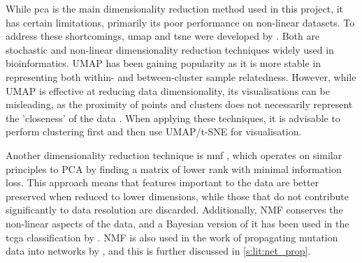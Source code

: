 While \acrshort{pca} is the main dimensionality reduction method used in this project, it has certain limitations, primarily its poor performance on non-linear datasets. To address these shortcomings, \acrfull{umap} and \acrfull{tsne} were developed by \citet{McInnes2018-dz,Hinton2002-pz} . Both are stochastic and non-linear dimensionality reduction techniques widely used in bioinformatics. UMAP has been gaining popularity as it is more stable in representing both within- and between-cluster sample relatedness. However, while UMAP is effective at reducing data dimensionality, its visualisations can be misleading, as the proximity of points and clusters does not necessarily represent the 'closeness' of the data \citep{Chari2023-et}. When applying these techniques, it is advisable to perform clustering first and then use UMAP/t-SNE for visualisation.

Another dimensionality reduction technique is \acrfull{nmf} \citep{Lee1999-fj}, which operates on similar principles to PCA by finding a matrix of lower rank with minimal information loss. This approach means that features important to the data are better preserved when reduced to lower dimensions, while those that do not contribute significantly to data resolution are discarded. Additionally, NMF conserves the non-linear aspects of the data, and a Bayesian version of it has been used in the \acrfull{tcga} classification by \citet{Robertson2017-mg}. NMF is also used in the work of propagating mutation data into networks by \citet{Yang2016-dm, Cai2008-fv}, and this is further discussed in \cref{s:lit:net_prop}.

